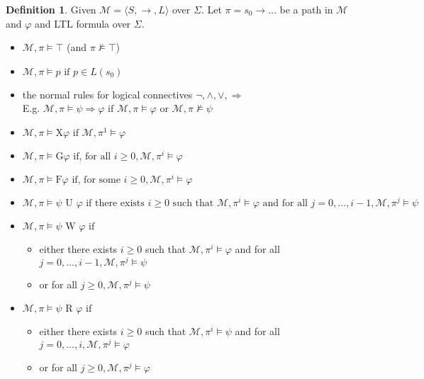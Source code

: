 \documentclass[10pt,a4paper]{article}
\theoremstyle{definition}
\newtheorem{definition}{Definition}[section]
\begin{document}
\begin{definition}
Given $\mathcal{M} = \langle S, \rightarrow, L \rangle$ over $\Sigma$. Let $\pi = s_0 \rightarrow \ldots$ be a path in $\mathcal{M}$ and $\varphi$ and LTL formula over $\Sigma$.

\begin{itemize}
	\item $\mathcal{M}, \pi \models \top$ (and $\pi  \not\models \top$)
	\item $\mathcal{M}, \pi \models p \text{ if } p \in L(s_0)$
	\item the normal rules for logical connectives $\lnot, \land, \lor, \Rightarrow$ \\
	 E.g. $\mathcal{M}, \pi \models \psi \Rightarrow \varphi \text{ if } \mathcal{M}, \pi \models \varphi \text{ or } \mathcal{M}, \pi \not\models \psi$
	 \item $\mathcal{M}, \pi \models \text{X}\varphi \text{ if } \mathcal{M}, \pi^1 \models \varphi$
	 \item $\mathcal{M}, \pi \models \text{G}\varphi \text{ if, for all } i \geq 0, \mathcal{M}, \pi^i \models \varphi$
	 \item $\mathcal{M}, \pi \models \text{F}\varphi \text{ if, for some } i \geq 0, \mathcal{M}, \pi^i \models \varphi$
	 \item $\mathcal{M}, \pi \models \psi \text{ U }\varphi \text{ if there exists } i \geq 0 \text{ such that } \mathcal{M}, \pi^i \models \varphi \text{ and for all } j = 0,\dots,i-1, \mathcal{M}, \pi^j \models \psi$
	 \item $\mathcal{M}, \pi \models \psi \text{ W }\varphi \text{ if }$
	 \begin{itemize}
	 	\item either there exists $i \geq 0$ such that $\mathcal{M}, \pi^i \models \varphi$ and for all $j = 0,\dots,i-1, \mathcal{M}, \pi^j \models \psi$
	 	\item or for all $j \geq 0, \mathcal{M}, \pi^j \models \psi$
	 \end{itemize}
	 \item $\mathcal{M}, \pi \models \psi \text{ R }\varphi \text{ if }$
	 \begin{itemize}
	 	\item either there exists $i \geq 0$ such that $\mathcal{M}, \pi^i \models \psi$ and for all $j = 0,\dots,i, \mathcal{M}, \pi^j \models \varphi$
	 	\item or for all $j \geq 0, \mathcal{M}, \pi^j \models \varphi$
	 \end{itemize} 
\end{itemize}
\end{definition}
\end{document}
